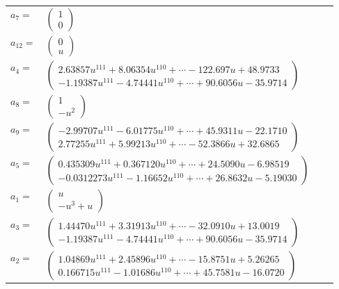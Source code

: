 \documentclass[1p]{elsarticle_modified}
\theoremstyle{definition}
\begin{document}
\begin{tabular}{m{7pt} m{180pt} m{7pt} m{180pt} }
\flushright $a_{7}=$&$\begin{pmatrix}1\\0\end{pmatrix}$ \\
\flushright $a_{12}=$&$\begin{pmatrix}0\\u\end{pmatrix}$ \\
\flushright $a_{4}=$&$\begin{pmatrix}2.63857 u^{111}+8.06354 u^{110}+\cdots-122.697 u+48.9733\\-1.19387 u^{111}-4.74441 u^{110}+\cdots+90.6056 u-35.9714\end{pmatrix}$ \\
\flushright $a_{8}=$&$\begin{pmatrix}1\\- u^2\end{pmatrix}$ \\
\flushright $a_{9}=$&$\begin{pmatrix}-2.99707 u^{111}-6.01775 u^{110}+\cdots+45.9311 u-22.1710\\2.77255 u^{111}+5.99213 u^{110}+\cdots-52.3866 u+32.6865\end{pmatrix}$ \\
\flushright $a_{5}=$&$\begin{pmatrix}0.435309 u^{111}+0.367120 u^{110}+\cdots+24.5090 u-6.98519\\-0.0312273 u^{111}-1.16652 u^{110}+\cdots+26.8632 u-5.19030\end{pmatrix}$ \\
\flushright $a_{1}=$&$\begin{pmatrix}u\\- u^3+u\end{pmatrix}$ \\
\flushright $a_{3}=$&$\begin{pmatrix}1.44470 u^{111}+3.31913 u^{110}+\cdots-32.0910 u+13.0019\\-1.19387 u^{111}-4.74441 u^{110}+\cdots+90.6056 u-35.9714\end{pmatrix}$ \\
\flushright $a_{2}=$&$\begin{pmatrix}1.04869 u^{111}+2.45896 u^{110}+\cdots-15.8751 u+5.26265\\0.166715 u^{111}-1.01686 u^{110}+\cdots+45.7581 u-16.0720\end{pmatrix}$ \\

\end{tabular}
\end{document}
